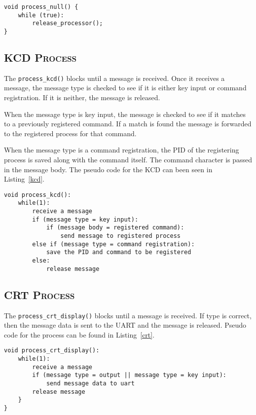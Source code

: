 \documentclass[oneside]{report}
\begin{document}
\begin{lstlisting}
void process_null() {
    while (true):
        release_processor();
}
\end{lstlisting}

\subsection{\textsc{KCD Process}}
The \texttt{process\_kcd()} blocks until a message is received. Once it
receives a message, the message type is checked to see if it is either
key input or command registration. If it is neither, the message is
released. 

When the message type is key input, the message is checked to see if
it matches to a previously registered command. If a match is found the
message is forwarded to the registered process for that command.

When the message type is a command registration, the PID of the
registering process is saved along with the command itself. The
command character is passed in the message body. The pseudo code for
the KCD can been seen in Listing~\ref{kcd}.

\begin{lstlisting}
void process_kcd():
    while(1):
        receive a message
        if (message type = key input):
            if (message body = registered command):
                send message to registered process
        else if (message type = command registration):
            save the PID and command to be registered
        else:
            release message
\end{lstlisting}

\subsection{\textsc{CRT Process}}
The \texttt{process\_crt\_display()} blocks until a message is
received. If type is correct, then the message data is sent to the
UART and the message is released. Pseudo code for the
process can be found in Listing~\ref{crt}.

\begin{lstlisting}
void process_crt_display():
    while(1):
        receive a message
        if (message type = output || message type = key input):
            send message data to uart
        release message
    }
}
\end{lstlisting}
\end{document}
